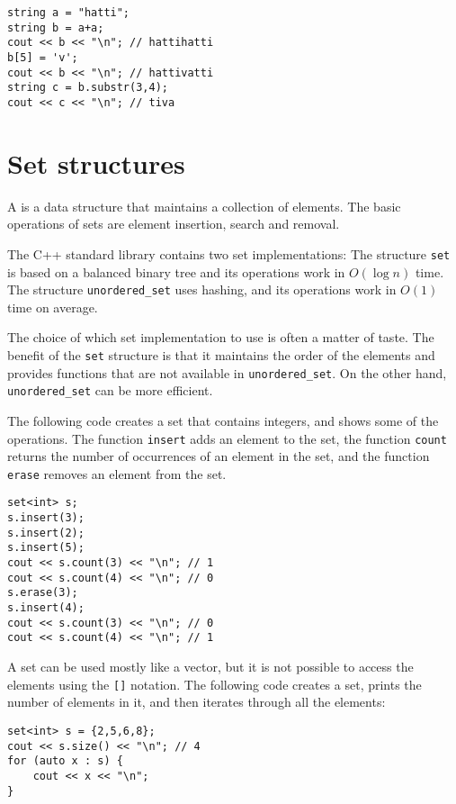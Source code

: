 \begin{lstlisting}
string a = "hatti";
string b = a+a;
cout << b << "\n"; // hattihatti
b[5] = 'v';
cout << b << "\n"; // hattivatti
string c = b.substr(3,4);
cout << c << "\n"; // tiva
\end{lstlisting}

\section{Set structures}


A  is a data structure that
maintains a collection of elements.
The basic operations of sets are element
insertion, search and removal.

The C++ standard library contains two set
implementations:
The structure \texttt{set} is based on a balanced
binary tree and its operations work in $O(\log n)$ time.
The structure \texttt{unordered\_set} uses hashing,
and its operations work in $O(1)$ time on average.

The choice of which set implementation to use
is often a matter of taste.
The benefit of the \texttt{set} structure
is that it maintains the order of the elements
and provides functions that are not available
in \texttt{unordered\_set}.
On the other hand, \texttt{unordered\_set}
can be more efficient.

The following code creates a set
that contains integers,
and shows some of the operations.
The function \texttt{insert} adds an element to the set,
the function \texttt{count} returns the number of occurrences
of an element in the set,
and the function \texttt{erase} removes an element from the set.

\begin{lstlisting}
set<int> s;
s.insert(3);
s.insert(2);
s.insert(5);
cout << s.count(3) << "\n"; // 1
cout << s.count(4) << "\n"; // 0
s.erase(3);
s.insert(4);
cout << s.count(3) << "\n"; // 0
cout << s.count(4) << "\n"; // 1
\end{lstlisting}

A set can be used mostly like a vector,
but it is not possible to access
the elements using the \texttt{[]} notation.
The following code creates a set,
prints the number of elements in it, and then
iterates through all the elements:
\begin{lstlisting}
set<int> s = {2,5,6,8};
cout << s.size() << "\n"; // 4
for (auto x : s) {
    cout << x << "\n";
}
\end{lstlisting}

